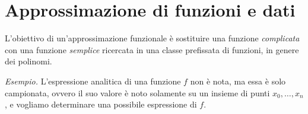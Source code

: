 
\chapter{Approssimazione di funzioni e dati}

L'obiettivo di un'approssimazione funzionale è sostituire una funzione \textit{complicata} con una funzione \textit{semplice} ricercata in una classe prefissata di funzioni, in genere dei polinomi.

\textit{Esempio.} L'espressione analitica di una funzione $f$ non è nota, ma essa è solo campionata, ovvero il suo valore è noto solamente su un insieme di punti $x_0, \dots, x_n$, e vogliamo determinare una possibile espressione di $f$.

